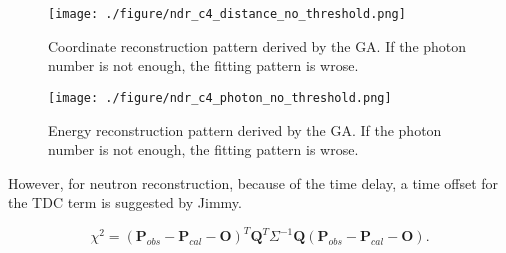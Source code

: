 \begin{figure}[h]
    \centering
    \texttt{[image: ./figure/ndr\_c4\_distance\_no\_threshold.png]}
    \caption[Coordinate reconstruction without threshold]
{
Coordinate reconstruction pattern derived by the GA.
If the photon number is not enough, the fitting pattern is wrose.
}
    \label{fig:ndr_c4_distance_no_threshold.png}
    \end{figure}



\begin{figure}[h]
    \centering
    \texttt{[image: ./figure/ndr\_c4\_photon\_no\_threshold.png]}
    \caption[Energy reconstruction without threshold]
{
Energy reconstruction pattern derived by the GA.
If the photon number is not enough, the fitting pattern is wrose.
}
    \label{fig:ndr_c4_photon_no_threshold.png}
    \end{figure}

%
%
%
%
%


However, for neutron reconstruction, because of the time delay, a time offset
for the TDC term is suggested by Jimmy.



\begin{equation}
\label{eq:fitnessChiTimeOffset}
\chi^{2} = (\mathbf{P}_{obs} - \mathbf{P}_{cal} - \mathbf{O})^T\mathbf{Q}^T\Sigma^{-1}\mathbf{Q}(\mathbf{P}_{obs} - \mathbf{P}_{cal} - \mathbf{O}).
\end{equation}

